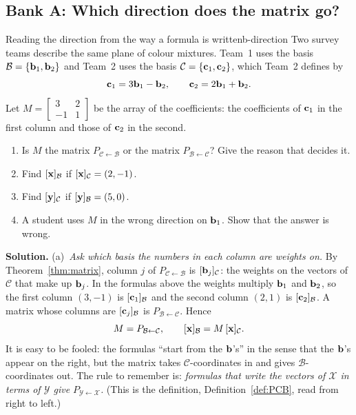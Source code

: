 \documentclass[11pt]{article}
\begin{document}
\subsection*{Bank A: Which direction does the matrix go?}
\begin{exmp}{Reading the direction from the way a formula is written}{b-direction}
Two survey teams describe the same plane of colour mixtures. Team~1 uses the basis $\mathcal{B}=\{\mathbf{b}_1,\mathbf{b}_2\}$ and Team~2 uses the basis $\mathcal{C}=\{\mathbf{c}_1,\mathbf{c}_2\}$, which Team~2 defines by
\[
\mathbf{c}_1=3\mathbf{b}_1-\mathbf{b}_2,\qquad \mathbf{c}_2=2\mathbf{b}_1+\mathbf{b}_2.
\]
Let $M=\begin{bmatrix}3&2\\-1&1\end{bmatrix}$ be the array of the coefficients: the coefficients of $\mathbf{c}_1$ in the first column and those of $\mathbf{c}_2$ in the second.
\begin{enumerate}
  \item[(a)] Is $M$ the matrix $P_{\mathcal{C}\leftarrow\mathcal{B}}$ or the matrix $P_{\mathcal{B}\leftarrow\mathcal{C}}$? Give the reason that decides it.
  \item[(b)] Find $[\mathbf{x}]_{\mathcal{B}}$ if $[\mathbf{x}]_{\mathcal{C}}=(2,-1)$.
  \item[(c)] Find $[\mathbf{y}]_{\mathcal{C}}$ if $[\mathbf{y}]_{\mathcal{B}}=(5,0)$.
  \item[(d)] A student uses $M$ in the wrong direction on $\mathbf{b}_1$. Show that the answer is wrong.
\end{enumerate}

\textbf{Solution.}
(a)~\emph{Ask which basis the numbers in each column are weights on.} By Theorem~\ref{thm:matrix}, column $j$ of $P_{\mathcal{C}\leftarrow\mathcal{B}}$ is $[\mathbf{b}_j]_{\mathcal{C}}$: the weights on the vectors of $\mathcal{C}$ that make up $\mathbf{b}_j$. In the formulas above the weights multiply $\mathbf{b}_1$ and $\mathbf{b}_2$, so the first column $(3,-1)$ is $[\mathbf{c}_1]_{\mathcal{B}}$ and the second column $(2,1)$ is $[\mathbf{c}_2]_{\mathcal{B}}$. A matrix whose columns are $[\mathbf{c}_j]_{\mathcal{B}}$ is $P_{\mathcal{B}\leftarrow\mathcal{C}}$. Hence
\[
M=P_{\mathcal{B}\leftarrow\mathcal{C}},\qquad [\mathbf{x}]_{\mathcal{B}}=M\,[\mathbf{x}]_{\mathcal{C}}.
\]
It is easy to be fooled: the formulas ``start from the $\mathbf{b}$'s'' in the sense that the $\mathbf{b}$'s appear on the right, but the matrix takes $\mathcal{C}$-coordinates in and gives $\mathcal{B}$-coordinates out. The rule to remember is: \emph{formulas that write the vectors of $\mathcal{X}$ in terms of $\mathcal{Y}$ give $P_{\mathcal{Y}\leftarrow\mathcal{X}}$.} (This is the definition, Definition~\ref{def:PCB}, read from right to left.)


\end{exmp}
\end{document}
